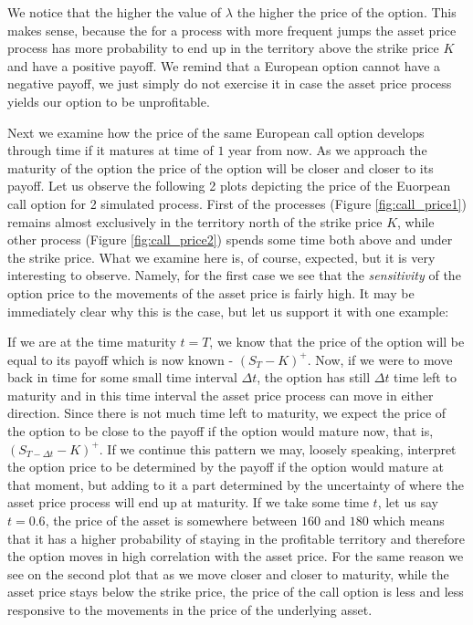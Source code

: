 \documentclass[times, utf8, diplomski]{fer}
\begin{document}
We notice that the higher the value of $\lambda$ the higher the price of the option. This makes sense, because the for a process with more frequent jumps the asset price process has more probability to end up in the territory above the strike price $K$ and have a positive payoff. We remind that a European option cannot have a negative payoff, we just simply do not exercise it in case the asset price process yields our option to be unprofitable. 

Next we examine how the price of the same European call option develops through time if it matures at time of $1$ year from now. As we approach the maturity of the option the price of the option will be closer and closer to its payoff. Let us observe the following 2 plots depicting the price of the Euorpean call option for 2 simulated process. First of the processes (Figure \ref{fig:call_price1}) remains almost exclusively in the territory north of the strike price $K$, while other process (Figure \ref{fig:call_price2}) spends some time both above and under the strike price. What we examine here is, of course, expected, but it is very interesting to observe. Namely, for the first case we see that the \textit{sensitivity} of the option price to the movements of the asset price is fairly high. It may be immediately clear why this is the case, but let us support it with one example:

\hfill \break
\indent If we are at the time maturity $t=T$, we know that the price of the option will be equal to its payoff which is now known - $(S_T - K)^+$. Now, if we were to move back in time for some small time interval $\Delta t$, the option has still $\Delta t$ time left to maturity and in this time interval the asset price process can move in either direction. Since there is not much time left to maturity, we expect the price of the option to be close to the payoff if the option would mature now, that is, $(S_{T-\Delta t} - K)^+$. If we continue this pattern we may, loosely speaking, interpret the option price to be determined by the payoff if the option would mature at that moment, but adding to it a part determined by the uncertainty of where the asset price process will end up at maturity.
If we take some time $t$, let us say $t=0.6$, the price of the asset is somewhere between $160$ and $180$ which means that it has a higher probability of staying in the profitable territory and therefore the option moves in high correlation with the asset price. For the same reason we see on the second plot that as we move closer and closer to maturity, while the asset price stays below the strike price, the price of the call option is less and less responsive to the movements in the price of the underlying asset. 
\end{document}
